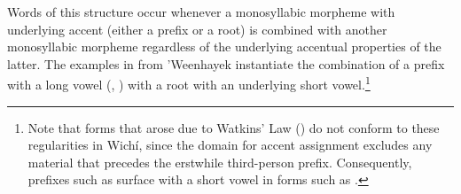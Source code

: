\begin{exe}
    \ex \mouthits \label{tr-mouthits}
    \ex \flowerits
    \ex \wordametits
    \ex \stingerits
    \ex \returnth
    \ex \burn
    \ex \daughterits \label{tr-daughterits}
    \ex \drinknitssg
    \ex \jarits
    \ex \fatv
    \ex \bite
    \ex \inhabitantits
    \ex \centipede
    \ex \pocote
    \ex \rootnabssg
    \ex \crab
    \ex \north
    \ex \suncho
    \ex \resinits
    \ex \lizard
    \ex \monkparakeet
    \ex \heavyv
    \ex \tortoise
    \ex \whitealgarrobof
    \ex \barnowl
    \ex \snail
    \ex \squash
    \ex \bowabssg
    \ex \daylhuma
    \ex \girlsg
    \ex \majan
    \ex \ropeabs
    \ex \dog
    \ex \pathnabs
    \ex \cavy \label{tr-cavy}
    \ex \frighten
    \ex \frog
    \ex \quick
    \ex \rainsg
    \ex \orphancw
    \ex \skycloud
    \ex \tapeti
    \ex \limpkin
    \ex \parakeet
    \ex \chachalaca
    \ex \wildcatsg
    \ex \whitequebracho
    \ex \anteater
    \ex \thunder
    \ex \toad
    \ex \river
    \ex \plate
    \ex \precipice
    \ex \far
    \ex \ant
    \ex \yellowlegs
    \ex \smokeabs
    \ex \silkfloss
    \ex \tsofa
    \ex \redbrocket
    \ex \hornero
    \ex \tired
    \ex \paloflojof
    \ex \metal
    \ex \balawasp
    \ex \whiteegret
    \ex \healthy
    \ex \butterfly
    \ex \spring
    \ex \fox
    \ex \moon
    \ex \iguana
    \ex \rat
    \ex \jararaca
    \ex \maguari
    \ex \femalebreastits
    \ex \hurt
    \ex \mosquito \label{tr-mosquito}
    \ex \parrot
    \ex \firei
    \ex \pigeon \label{tr-pigeon}
    \ex \bro
    \ex \doveula
    \ex \urineits
\end{exe}

Words of this structure occur whenever a monosyllabic morpheme with underlying accent (either a prefix or a root) is combined with another monosyllabic morpheme regardless of the underlying accentual properties of the latter. The examples in  from 'Weenhayek instantiate the combination of a prefix with a long vowel (, ) with a root with an underlying short vowel.\footnote{Note that forms that arose due to Watkins' Law () do not conform to these regularities in Wichí, since the domain for accent assignment excludes any material that precedes the erstwhile third-person prefix. Consequently, prefixes such as  surface with a short vowel in forms such as .\label{proswatkfn}}

